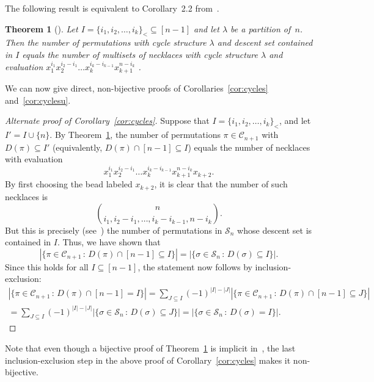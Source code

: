 \documentclass[11pt]{amsart}
\newtheorem{theorem}{Theorem}[section]
\newcommand\bmt{\begin{multline*}}
\renewcommand\S{\mathcal S}
\newcommand\C{\mathcal C}
\begin{document}
The following result is equivalent to Corollary~2.2 from~\cite{GR}.

\begin{theorem}[\cite{GR}]\label{thm:GR}
Let $I=\{i_1,i_2,\dots,i_k\}_<\subseteq[n-1]$ and let $\lambda$ be a partition of~$n$. Then the number of permutations with cycle structure $\lambda$ and descent set contained in $I$ equals the number of multisets of necklaces with cycle structure $\lambda$ and evaluation $x_1^{i_1}x_2^{i_2-i_1}\dots x_k^{i_k-i_{k-1}}x_{k+1}^{n-i_k}$ .
\end{theorem}

We can now give direct, non-bijective proofs of Corollaries~\ref{cor:cycles} and~\ref{cor:cyclesu}.

\begin{proof}[Alternate proof of Corollary~\ref{cor:cycles}]
Suppose that $I=\{i_1,i_2,\dots,i_k\}_<$, and let $I'=I\cup\{n\}$.
By Theorem~\ref{thm:GR}, the number of permutations $\pi\in\C_{n+1}$ with $D(\pi)\subseteq I'$ (equivalently, $D(\pi)\cap[n-1]\subseteq I$) equals the number of necklaces with evaluation
$$x_1^{i_1}x_2^{i_2-i_1}\dots x_k^{i_k-i_{k-1}}x_{k+1}^{n-i_k}x_{k+2}.$$
By first choosing the bead labeled $x_{k+2}$, it is clear that the number of such necklaces is $$\binom{n}{i_1,i_2-i_1,\dots,i_k-i_{k-1},n-i_k}.$$
But this is precisely (see~\cite{EC1}) the number of permutations in $\S_n$ whose descent set is contained in $I$. Thus, we have shown that
$$|\{\pi\in\C_{n+1}\,:\,D(\pi)\cap[n-1]\subseteq I\}|=|\{\sigma\in\S_n\,:\,D(\sigma)\subseteq I\}|.$$
Since this holds for all $I\subseteq[n-1]$, the statement now follows by inclusion-exclusion:
\bmt |\{\pi\in\C_{n+1}\,:\,D(\pi)\cap[n-1]=I\}|=\sum_{J\subseteq I}(-1)^{|I|-|J|}|\{\pi\in\C_{n+1}\,:\,D(\pi)\cap[n-1]\subseteq J\}|\\
=\sum_{J\subseteq I}(-1)^{|I|-|J|}|\{\sigma\in\S_n\,:\,D(\sigma)\subseteq J\}|=|\{\sigma\in\S_n\,:\,D(\sigma)=I\}|.
\end{multline*}
\end{proof}

Note that even though a bijective proof of Theorem~\ref{thm:GR} is implicit in~\cite{GR}, the last inclusion-exclusion step in the above proof of Corollary~\ref{cor:cycles} makes it non-bijective.
\end{document}
